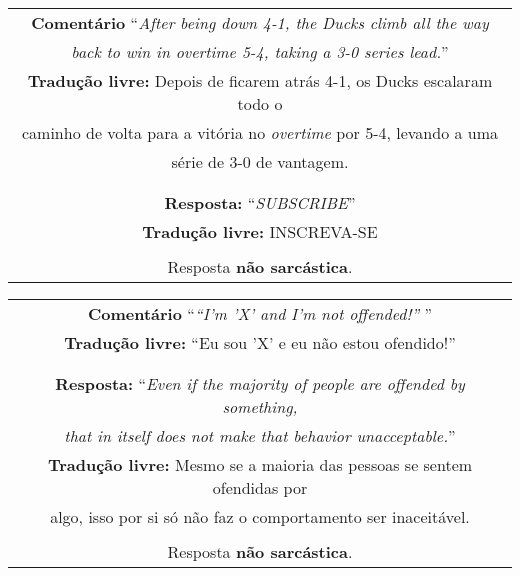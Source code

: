 \begin{center}
\begin{tabular}{|c|}

\hline

\textbf{Comentário} ``\textit{After being down 4-1, the Ducks climb all the way} \\
\textit{back to win in overtime 5-4, taking a 3-0 series lead.}'' \\

\textbf{Tradução livre:} Depois de ficarem atrás 4-1, os Ducks escalaram todo o \\
caminho de volta para a vitória no \textit{overtime} por 5-4, levando a uma \\
série de 3-0 de vantagem. \\\\

\hline

\\

\textbf{Resposta:} ``\textit{SUBSCRIBE}'' \\

\textbf{Tradução livre:} INSCREVA-SE \\ \\

Resposta \textbf{não sarcástica}.

\\ \hline

\end{tabular}
\end{center}

\begin{center}
\begin{tabular}{|c|}

\hline

\textbf{Comentário} ``\textit{``I'm 'X' and I'm not offended!''} '' \\

\textbf{Tradução livre:} ``Eu sou 'X' e eu não estou ofendido!'' \\ \\

\hline

\\

\textbf{Resposta:} ``\textit{Even if the majority of people are offended by something,} \\
\textit{that in itself does not make that behavior unacceptable.}'' \\

\textbf{Tradução livre:} Mesmo se a maioria das pessoas se sentem ofendidas por \\
algo, isso por si só não faz o comportamento ser inaceitável. \\ \\

Resposta \textbf{não sarcástica}.

\\ \hline

\end{tabular}
\end{center}

